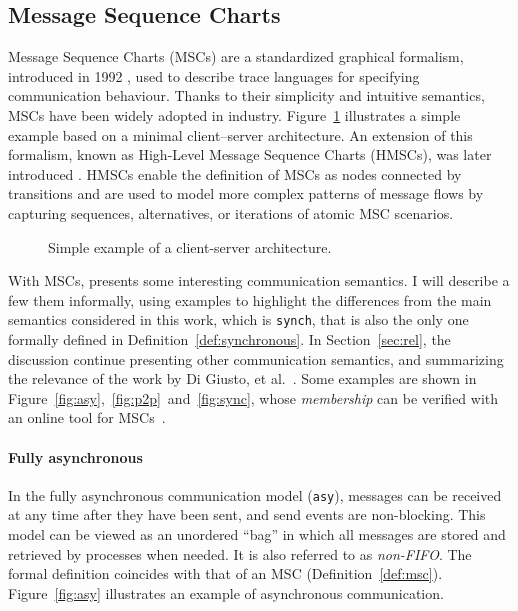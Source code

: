 \subsection{Message Sequence Charts}
Message Sequence Charts (MSCs) are a standardized graphical formalism,
introduced in 1992 \cite{MSCStandard}, used to describe trace languages for specifying
communication behaviour. Thanks to their simplicity and intuitive
semantics, MSCs have been widely adopted in industry.
Figure~\ref{fig:msc-cli-ser} illustrates a simple example based on a
minimal client–server architecture. An extension of this formalism,
known as High-Level Message Sequence Charts (HMSCs), was later
introduced \cite{HMSCStandard}. HMSCs enable the definition of
MSCs as nodes connected by transitions and are used to model more
complex patterns of message flows by capturing sequences, alternatives,
or iterations of atomic MSC scenarios.

\begin{figure}[!ht]
\centering
\begin{msc}[draw frame=none, draw head=none, msc keyword=, head height=0px, label distance=0.5ex, foot height=0px, foot distance=0px]{}

	\nextlevel
\end{msc}
\caption{Simple example of a client-server architecture.}
\label{fig:msc-cli-ser}
\end{figure}

With MSCs, \cite{di2023partial} presents some interesting communication
semantics. I will describe a few them informally, using examples to
highlight the differences from the main semantics considered in this work,
which is \verb|synch|, that is also the only one formally defined in 
Definition~\ref{def:synchronous}. In Section~\ref{sec:rel}, the discussion
continue presenting other communication semantics, and summarizing
the relevance of the work by Di Giusto, et al.~\cite{di2023partial}.
Some examples are shown in 
Figure~\ref{fig:asy},~\ref{fig:p2p}~and~\ref{fig:sync},
whose \emph{membership} 
can be verified with an online tool for MSCs~\cite{MSCTool}. 

\paragraph{Fully asynchronous}

In the fully asynchronous communication model (\verb|asy|), messages can be 
received at any time after they have been sent, and send events are 
non-blocking. This model can be viewed as an unordered ``bag'' in which 
all messages are stored and retrieved by processes when needed. It is also 
referred to as \emph{non-FIFO}. The formal definition coincides with that of 
an MSC (Definition~\ref{def:msc}). Figure~\ref{fig:asy} illustrates an example of asynchronous 
communication.

